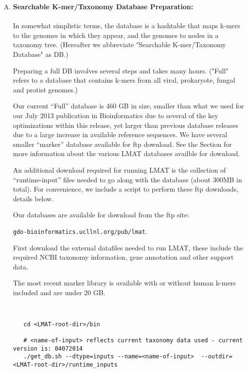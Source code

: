\documentclass[11pt]{article}
\begin{document}
\begin{enumerate}[A.]
\label{sec:over-a}

   \item 
{
   {\bf Searchable K-mer/Taxonomy Database Preparation:}\\
   \\
    In somewhat simplistic 
     terms, the database is a hashtable that maps k-mers to the genomes in which they
     appear, and the genomes to nodes in a taxonomy tree. (Hereafter
     we abbreviate "Searchable K-mer/Taxonomy Database" as DB.)

     Preparing a full DB involves several steps and takes many hours. 
     ("Full" refers to a database that contains k-mers from
     all viral, prokaryote, fungal and protist genomes.)

     Our current ``Full'' database is 460 GB in size, smaller than
     what we used for our July 2013 publication in Bioinformatics due
     to several of the key optimizations within this release, yet
     larger than previous database releases due to a large increase in
     available reference sequences.  We have several smaller
     ``marker'' database available for ftp download.  See the
      Section for more information about the
     various LMAT databases availble for download.

     An additional download required for running LMAT is the
     collection of ``runtime-input'' files needed to go along with the
     database (about 300MB in total).  For convenience, we include a
     script to perform these ftp downloads, details below.
     

Our databases are available for download from the ftp site:

     \texttt{gdo-bioinformatics.ucllnl.org/pub/lmat}.  


   First download the external datafiles needed to run LMAT, these include the required NCBI taxonomy information, gene annotation and other support data.

   The most recent marker library is available with or without human k-mers included and are under 20 GB.



\begin{verbatim}


   cd <LMAT-root-dir>/bin

   # <name-of-input> reflects current taxonomy data used - current version is: 04072014
   ./get_db.sh --dtype=inputs --name=<name-of-input>  --outdir=<LMAT-root-dir>/runtime_inputs


\end{verbatim}}
\end{enumerate}
\end{document}
